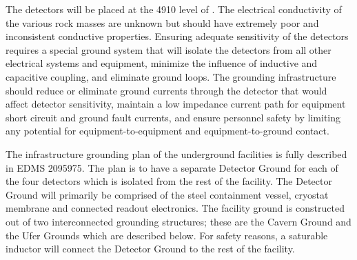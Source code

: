The detectors will be placed at the 4910 level of \surf. The
electrical conductivity of the various rock masses are unknown but
should have extremely poor and inconsistent conductive
properties. Ensuring adequate sensitivity of the detectors requires a
special ground system that will isolate the detectors from all other
electrical systems and equipment, minimize the influence of inductive
and capacitive coupling, and eliminate ground loops. The grounding
infrastructure should reduce or eliminate ground currents through the
detector that would affect detector sensitivity, maintain a low
impedance current path for equipment short circuit and ground fault
currents, and ensure personnel safety by limiting any potential for
equipment-to-equipment and equipment-to-ground contact.

The infrastructure grounding plan of the underground facilities is fully described in EDMS 2095975.  The plan is to have a separate Detector Ground for each of the four detectors which is isolated from the rest of the facility.  The Detector Ground will primarily be comprised of the steel containment vessel, cryostat membrane and connected readout electronics.  The facility ground is constructed out of two interconnected grounding structures; these are the Cavern Ground and the Ufer Grounds which are described below.  For safety reasons, a saturable inductor will connect the Detector Ground to the rest of the facility. 

